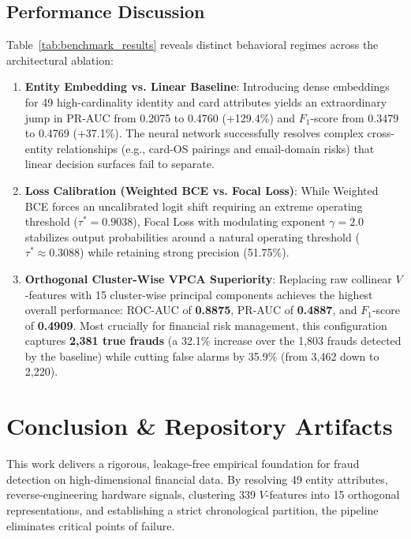 \documentclass[conference]{IEEEtran}
\begin{document}
\subsection{Performance Discussion}
Table~\ref{tab:benchmark_results} reveals distinct behavioral regimes across the architectural ablation:
\begin{enumerate}
    \item \textbf{Entity Embedding vs. Linear Baseline}: Introducing dense embeddings for 49 high-cardinality identity and card attributes yields an extraordinary jump in PR-AUC from 0.2075 to 0.4760 (+129.4\%) and $F_1$-score from 0.3479 to 0.4769 (+37.1\%). The neural network successfully resolves complex cross-entity relationships (e.g., card-OS pairings and email-domain risks) that linear decision surfaces fail to separate.
    \item \textbf{Loss Calibration (Weighted BCE vs. Focal Loss)}: While Weighted BCE forces an uncalibrated logit shift requiring an extreme operating threshold ($\tau^* = 0.9038$), Focal Loss with modulating exponent $\gamma=2.0$ stabilizes output probabilities around a natural operating threshold ($\tau^* \approx 0.3088$) while retaining strong precision (51.75\%).
    \item \textbf{Orthogonal Cluster-Wise VPCA Superiority}: Replacing raw collinear $V$-features with 15 cluster-wise principal components achieves the highest overall performance: ROC-AUC of \textbf{0.8875}, PR-AUC of \textbf{0.4887}, and $F_1$-score of \textbf{0.4909}. Most crucially for financial risk management, this configuration captures \textbf{2,381 true frauds} (a 32.1\% increase over the 1,803 frauds detected by the baseline) while cutting false alarms by 35.9\% (from 3,462 down to 2,220).
\end{enumerate}

\section{Conclusion \& Repository Artifacts}
This work delivers a rigorous, leakage-free empirical foundation for fraud detection on high-dimensional financial data. By resolving 49 entity attributes, reverse-engineering hardware signals, clustering 339 $V$-features into 15 orthogonal representations, and establishing a strict chronological partition, the pipeline eliminates critical points of failure.
\end{document}
